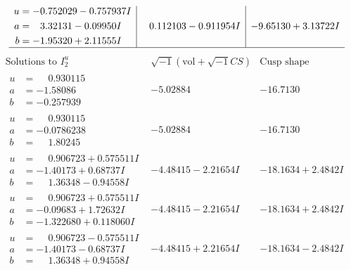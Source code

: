\documentclass[1p]{elsarticle_modified}
\theoremstyle{definition}
\newcommand{\I}{\sqrt{-1}}
\begin{document}
$$\begin{array}{c|c|c}
\begin{aligned}
u &= -0.752029 - 0.757937 I \\
a &= \phantom{-}3.32131 - 0.09950 I \\
b &= -1.95320 + 2.11555 I\end{aligned}
 & \phantom{-}0.112103 - 0.911954 I & -9.65130 + 3.13722 I\\
 \hline 
 \end{array}$$\newpage$$\begin{array}{c|c|c}  
\text{Solutions to }I^u_{2}& \I (\text{vol} + \sqrt{-1}CS) & \text{Cusp shape}\\
 \hline 
\begin{aligned}
u &= \phantom{-}0.930115\phantom{ +0.000000I} \\
a &= -1.58086\phantom{ +0.000000I} \\
b &= -0.257939\phantom{ +0.000000I}\end{aligned}
 & -5.02884\phantom{ +0.000000I} & -16.7130\phantom{ +0.000000I} \\ \hline\begin{aligned}
u &= \phantom{-}0.930115\phantom{ +0.000000I} \\
a &= -0.0786238\phantom{ +0.000000I} \\
b &= \phantom{-}1.80245\phantom{ +0.000000I}\end{aligned}
 & -5.02884\phantom{ +0.000000I} & -16.7130\phantom{ +0.000000I} \\ \hline\begin{aligned}
u &= \phantom{-}0.906723 + 0.575511 I \\
a &= -1.40173 + 0.68737 I \\
b &= \phantom{-}1.36348 - 0.94558 I\end{aligned}
 & -4.48415 - 2.21654 I & -18.1634 + 2.4842 I \\ \hline\begin{aligned}
u &= \phantom{-}0.906723 + 0.575511 I \\
a &= -0.09683 + 1.72632 I \\
b &= -1.322680 + 0.118060 I\end{aligned}
 & -4.48415 - 2.21654 I & -18.1634 + 2.4842 I \\ \hline\begin{aligned}
u &= \phantom{-}0.906723 - 0.575511 I \\
a &= -1.40173 - 0.68737 I \\
b &= \phantom{-}1.36348 + 0.94558 I\end{aligned}
 & -4.48415 + 2.21654 I & -18.1634 - 2.4842 I \\ \hline\begin{aligned}

\end{aligned}
\end{array}$$
\end{document}

